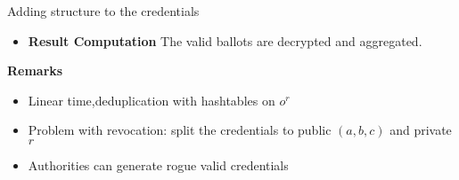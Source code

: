 \documentclass{beamer}
\begin{document}
\begin{frame}[allowframebreaks]{Adding structure to the credentials \cite{AraujoFT07}}
\begin{itemize}
\begin{itemize}
\begin{itemize}
		\item If the credential is valid then the result of the computation should decrypt to $1$. 
		\item \textbf{Why blinding} If the credential is invalid then $\frac{Reenc(c)}{(Reenc(a)^x Reenc(b^r)^x)}$ might yield information about the relationship between $a,b,c$ in order to construct a fake but valid credential
		\end{itemize}		  
		\item \textbf{Result Computation} The valid ballots are decrypted and aggregated.
	\end{itemize}
\end{itemize}

\textbf{Remarks}

\begin{itemize}
\item Linear time,deduplication with hashtables on $o^r$
\item Problem with revocation: split the credentials to public $(a,b,c)$ and private $r$ 
\item Authorities can generate rogue valid credentials
\end{itemize}
 
\end{frame}
\end{document}
